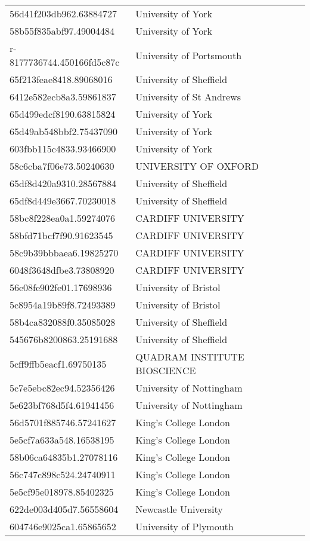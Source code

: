 \begin{tabular}{ll}
56d41f203db962.63884727 & University of York \\
58b55f835abf97.49004484 & University of York \\
r-8177736744.450166fd5c87c & University of Portsmouth \\
65f213feae8418.89068016 & University of Sheffield \\
6412e582ecb8a3.59861837 & University of St Andrews \\
65d499edcf8190.63815824 & University of York \\
65d49ab548bbf2.75437090 & University of York \\
603fbb115c4833.93466900 & University of York \\
58c6cba7f06e73.50240630 & UNIVERSITY OF OXFORD \\
65df8d420a9310.28567884 & University of Sheffield \\
65df8d449e3667.70230018 & University of Sheffield \\
58bc8f228ea0a1.59274076 & CARDIFF UNIVERSITY \\
58bfd71bcf7f90.91623545 & CARDIFF UNIVERSITY \\
58c9b39bbbaea6.19825270 & CARDIFF UNIVERSITY \\
6048f3648dfbe3.73808920 & CARDIFF UNIVERSITY \\
56e08fe902fe01.17698936 & University of Bristol \\
5c8954a19b89f8.72493389 & University of Bristol \\
58b4ca832088f0.35085028 & University of Sheffield \\
545676b8200863.25191688 & University of Sheffield \\
5cff9ffb5eacf1.69750135 & QUADRAM INSTITUTE BIOSCIENCE \\
5c7e5ebc82ec94.52356426 & University of Nottingham \\
5e623bf768d5f4.61941456 & University of Nottingham \\
56d5701f885746.57241627 & King's College London \\
5e5cf7a633a548.16538195 & King's College London \\
58b06ca64835b1.27078116 & King's College London \\
56c747c898c524.24740911 & King's College London \\
5e5cf95e018978.85402325 & King's College London \\
622de003d405d7.56558604 & Newcastle University \\
604746e9025ca1.65865652 & University of Plymouth \\

\end{tabular}
